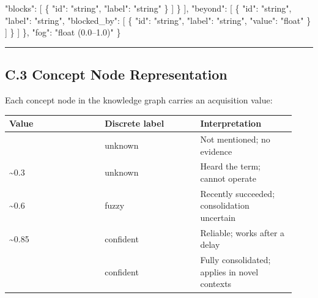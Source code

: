 \documentclass[
]{article}
\newenvironment{Shaded}{}{}
\newcommand{\DataTypeTok}[1]{\textcolor[rgb]{0.56,0.13,0.00}{#1}}
\newcommand{\FunctionTok}[1]{\textcolor[rgb]{0.02,0.16,0.49}{#1}}
\newcommand{\OtherTok}[1]{\textcolor[rgb]{0.00,0.44,0.13}{#1}}
\newcommand{\StringTok}[1]{\textcolor[rgb]{0.25,0.44,0.63}{#1}}
\newcounter{none} %
\begin{document}
\begin{Shaded}
\begin{Highlighting}[]
        \DataTypeTok{"blocks"}\FunctionTok{:} \OtherTok{[} \FunctionTok{\{} \DataTypeTok{"id"}\FunctionTok{:} \StringTok{"string"}\FunctionTok{,} \DataTypeTok{"label"}\FunctionTok{:} \StringTok{"string"} \FunctionTok{\}} \OtherTok{]}
      \FunctionTok{\}}
    \OtherTok{]}\FunctionTok{,}
    \DataTypeTok{"beyond"}\FunctionTok{:} \OtherTok{[}
      \FunctionTok{\{}
        \DataTypeTok{"id"}\FunctionTok{:} \StringTok{"string"}\FunctionTok{,}
        \DataTypeTok{"label"}\FunctionTok{:} \StringTok{"string"}\FunctionTok{,}
        \DataTypeTok{"blocked\_by"}\FunctionTok{:} \OtherTok{[} \FunctionTok{\{} \DataTypeTok{"id"}\FunctionTok{:} \StringTok{"string"}\FunctionTok{,} \DataTypeTok{"label"}\FunctionTok{:} \StringTok{"string"}\FunctionTok{,} \DataTypeTok{"value"}\FunctionTok{:} \StringTok{"float"} \FunctionTok{\}} \OtherTok{]}
      \FunctionTok{\}}
    \OtherTok{]}
  \FunctionTok{\},}
  \DataTypeTok{"fog"}\FunctionTok{:} \StringTok{"float (0.0–1.0)"}
\FunctionTok{\}}
\end{Highlighting}
\end{Shaded}

\begin{center}\rule{0.5\linewidth}{0.5pt}\end{center}

\subsection{C.3 Concept Node Representation}\label{c3-concept-node-representation}

Each concept node in the knowledge graph carries an acquisition value:

{\def\LTcaptype{none} %
\begin{longtable}[]{@{}>{\raggedright\arraybackslash}p{0.310\linewidth}>{\raggedright\arraybackslash}p{0.310\linewidth}>{\raggedright\arraybackslash}p{0.310\linewidth}@{}}
\toprule\noalign{}
Value & Discrete label & Interpretation \\
\midrule\noalign{}
\endhead
\bottomrule\noalign{}
\endlastfoot
0.0 & unknown & Not mentioned; no evidence \\
\textasciitilde0.3 & unknown & Heard the term; cannot operate \\
\textasciitilde0.6 & fuzzy & Recently succeeded; consolidation uncertain \\
\textasciitilde0.85 & confident & Reliable; works after a delay \\
1.0 & confident & Fully consolidated; applies in novel contexts \\
\end{longtable}
}
\end{document}
